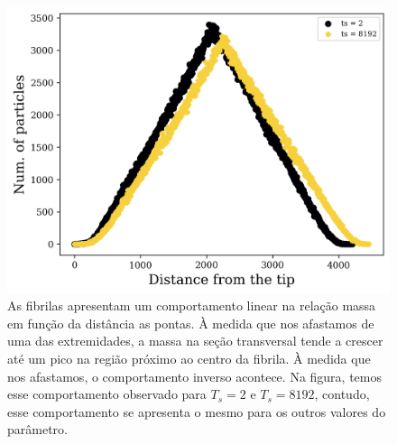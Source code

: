\documentclass{article}
\begin{document}
\begin{figure}[h]
    \centering
    \includegraphics[width=\textwidth]{figures/particles_distance.png}

    \caption{As fibrilas apresentam um comportamento linear na relação massa em função da distância as pontas. À medida que nos afastamos de uma das extremidades, a massa na seção transversal tende a crescer até um pico na região próximo ao centro da fibrila. À medida que nos afastamos, o comportamento inverso acontece. Na figura, temos esse comportamento observado para $T_{s} = 2 $ e $T_{s} =8192$, contudo, esse comportamento se apresenta o mesmo para os outros valores do parâmetro.} 

    \label{}
\end{figure}
\end{document}
